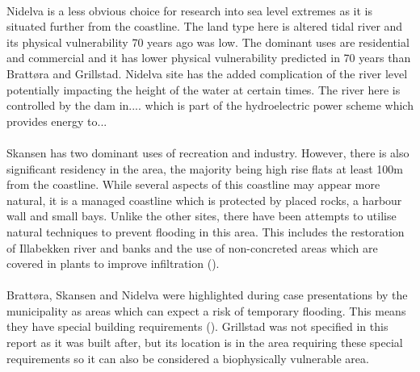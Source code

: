 \paragraph{}
Nidelva is a less obvious choice for research into sea level extremes as it is situated further from the coastline. The land type here is altered tidal river and its physical vulnerability 70 years ago was low. The dominant uses are residential and commercial and it has lower physical vulnerability predicted in 70 years than Brattøra and Grillstad. Nidelva site has the added complication of the river level potentially impacting the height of the water at certain times. The river here is controlled by the dam in.... which is part of the hydroelectric power scheme which provides energy to...
\paragraph{}
Skansen has two dominant uses of recreation and industry. However, there is also significant residency in the area, the majority being high rise flats at least 100m from the coastline. While several aspects of this coastline may appear more natural, it is a managed coastline which is protected by placed rocks, a harbour wall and small bays. Unlike the other sites, there have been attempts to utilise natural techniques to prevent flooding in this area. This includes the restoration of Illabekken river and banks and the use of non-concreted areas which are covered in plants to improve infiltration (\cite{selliseth_ilabekken_2021}).
\paragraph{}

\paragraph{}
Brattøra, Skansen and Nidelva were highlighted during case presentations by the municipality as areas which can expect a risk of temporary flooding. This means they have special building requirements (\cite{hanssen_saksframlegg_2013}). Grillstad was not specified in this report as it was built after, but its location is in the area requiring these special requirements so it can also be considered a biophysically vulnerable area.  


